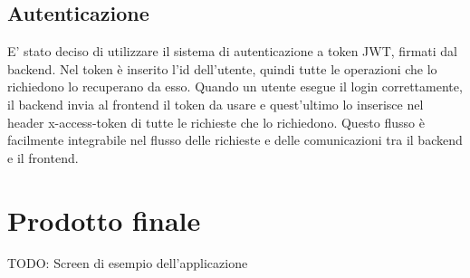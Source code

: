 \subsection{Autenticazione}
E' stato deciso di utilizzare il sistema di autenticazione a token JWT, firmati
dal backend.
Nel token è inserito l'id dell'utente, quindi tutte le operazioni che lo
richiedono lo recuperano da esso.
Quando un utente esegue il login correttamente, il backend invia al frontend
il token da usare e quest’ultimo lo inserisce nel header x-access-token di tutte
le richieste che lo richiedono.
Questo flusso è facilmente integrabile nel flusso delle richieste e delle comunicazioni tra il backend e il frontend.

\section{Prodotto finale}
TODO: Screen di esempio dell'applicazione
